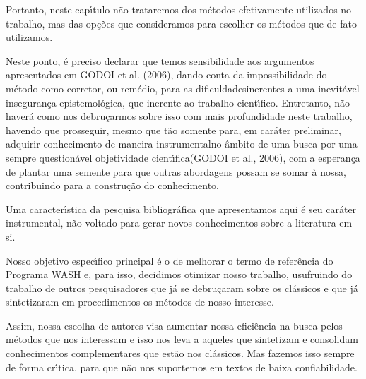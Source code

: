 \documentclass[
12pt,		%
openright,	%
twoside,  %
a4paper,			%
chapter=TITLE,		%
english,			%
french,				%
spanish,			%
brazil				%
]{USPSC-classe/USPSC}
\begin{document}
Portanto, neste cap\'{\i}tulo n\~ao trataremos dos m\'etodos efetivamente utilizados no trabalho, mas das op\c{c}\~oes que consideramos para escolher os m\'etodos que de fato utilizamos.










Neste ponto, \'e preciso declarar que temos sensibilidade aos argumentos apresentados em  GODOI et al. (2006), dando conta da impossibilidade \textquotedbl do m\'etodo como corretor, ou rem\'edio, para as dificuldades\textquotedbl  inerentes a uma inevit\'avel \textquotedbl inseguran\c{c}a epistemol\'ogica\textquotedbl , que inerente ao trabalho cient\'{\i}fico. Entretanto, n\~ao haver\'a como nos debru\c{c}armos sobre isso com mais profundidade neste trabalho, havendo que prosseguir, mesmo que t\~ao somente para, em car\'ater preliminar, \textquotedbl adquirir conhecimento de maneira instrumental\textquotedbl  no \^ambito de uma busca por uma sempre question\'avel \textquotedbl objetividade cient\'{\i}fica\textquotedbl  (GODOI et al., 2006), com a esperan\c{c}a de plantar uma semente para que outras abordagens possam se somar \`a nossa, contribuindo para a constru\c{c}\~ao do conhecimento.










Uma caracter\'{\i}stica da pesquisa bibliogr\'afica que apresentamos aqui \'e seu  car\'ater instrumental, n\~ao voltado para gerar novos conhecimentos sobre a literatura em si.










Nosso objetivo espec\'{\i}fico principal \'e o de melhorar o termo de refer\^encia do Programa WASH e, para isso, decidimos otimizar nosso trabalho, usufruindo do trabalho de outros pesquisadores que j\'a se debru\c{c}aram sobre os cl\'assicos e que j\'a sintetizaram em procedimentos os m\'etodos de nosso interesse.










Assim, nossa escolha de autores visa aumentar nossa efici\^encia na busca pelos m\'etodos que nos interessam e isso nos leva a aqueles que sintetizam e consolidam conhecimentos complementares que est\~ao nos cl\'assicos. Mas fazemos isso sempre de forma cr\'{\i}tica, para que n\~ao nos suportemos em textos de baixa confiabilidade.
\end{document}
